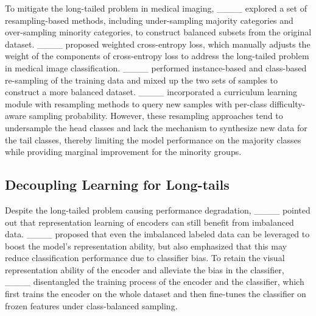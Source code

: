 To mitigate the long-tailed problem in medical imaging, ____ explored a set of resampling-based methods, including under-sampling majority categories and over-sampling minority categories, to construct balanced subsets from the original dataset. 
____ proposed weighted cross-entropy loss, which manually adjusts the weight of the components of cross-entropy loss to address the long-tailed problem in medical image classification.
____ performed instance-based and class-based re-sampling of the training data and mixed up the two sets of samples to construct a more balanced dataset.
____ incorporated a curriculum learning module with resampling methods to query new samples with per-class difficulty-aware sampling probability. However, these resampling approaches tend to undersample the head classes and lack the mechanism to synthesize new data for the tail classes, thereby limiting the model performance on the majority classes while providing marginal improvement for the minority groups.

\subsection{Decoupling Learning for Long-tails}
Despite the long-tailed problem causing performance degradation, ____ pointed out that representation learning of encoders can still benefit from imbalanced data.
____ proposed that even the imbalanced labeled data can be leveraged to boost the model's representation ability, but also emphasized that this may reduce classification performance due to classifier bias.  
To retain the visual representation ability of the encoder and alleviate the bias in the classifier, ____ disentangled the training process of the encoder and the classifier, which first trains the encoder on the whole dataset and then fine-tunes the classifier on frozen features under class-balanced sampling.

